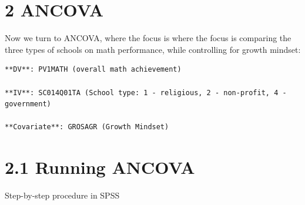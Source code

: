 \documentclass[
  letterpaper,
  DIV=11,
  numbers=noendperiod]{scrreprt}
\begin{document}
\section*{2 ANCOVA}\label{ancova-1}


Now we turn to ANCOVA, where the focus is where the focus is comparing
the three types of schools on math performance, while controlling for
growth mindset:

\begin{verbatim}
**DV**: PV1MATH (overall math achievement) 

**IV**: SC014Q01TA (School type: 1 - religious, 2 - non-profit, 4 - government) 

**Covariate**: GROSAGR (Growth Mindset) 
\end{verbatim}

\section*{2.1 Running ANCOVA}\label{running-ancova-1}


Step-by-step procedure in SPSS
\end{document}
